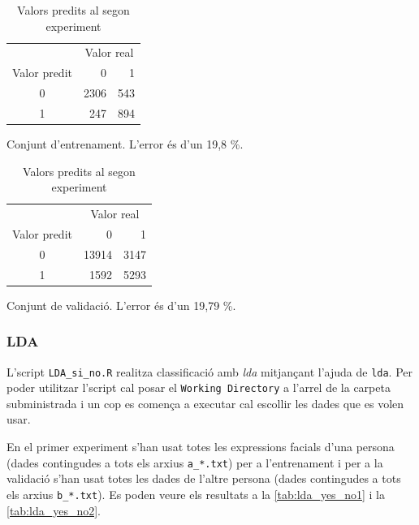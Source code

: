 \documentclass[a4paper]{article}
\begin{document}
\begin{table}[H]
	\def\arraystretch{1.3}
	\begin{subtable}[t]{0.49\textwidth}
		\centering
		\begin{tabular}{|c|rr|}
			\hline
			& \multicolumn{2}{c|}{Valor real} \\
			Valor predit & 0 & 1 \\
			\hline
			0 & 2306 & 543 \\
			1 &  247 & 894 \\
			\hline
		\end{tabular}
		\caption{Conjunt d'entrenament. L'error és d'un 19,8 \%.}
		\label{tab:reglog_training3}
	\end{subtable}
	\hfill
	\begin{subtable}[t]{0.49\textwidth}
		\centering
		\begin{tabular}{|c|rr|}
			\hline
			& \multicolumn{2}{c|}{Valor real} \\
			Valor predit & 0 & 1 \\
			\hline
			0 & 13914 & 3147 \\
			1 &  1592 & 5293 \\
			\hline
		\end{tabular}
		\caption{Conjunt de validació. L'error és d'un 19,79 \%.}
		\label{tab:reglog_training4}
	\end{subtable}
	\caption{Valors predits al segon experiment}
\end{table}

\subsubsection{LDA}
L'script \verb|LDA_si_no.R| realitza classificació amb \emph{lda} mitjançant l'ajuda de \verb|lda|. Per poder utilitzar l'script cal posar el \verb|Working Directory| a l'arrel de la carpeta subministrada i un cop es comença a executar cal escollir les dades que es volen usar. 
 
En el primer experiment s'han usat totes les expressions facials d'una persona (dades contingudes a tots els arxius \verb|a_*.txt|) per a l'entrenament i per a la validació s'han usat totes les dades de l'altre persona (dades contingudes a tots els arxius \verb|b_*.txt|). Es poden veure els resultats a la \autoref{tab:lda_yes_no1} i la 	\autoref{tab:lda_yes_no2}.
\end{document}
